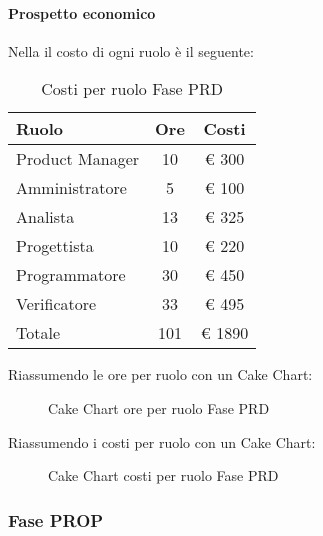 			\paragraph{Prospetto economico}
				Nella  il costo di ogni ruolo è il seguente:
				\begin{table}
					\begin{center}
						\begin{tabular}{| l | c | c |}
							\hline
							Ruolo 				& Ore 		& Costi  \\ \hline
							
							Product Manager		& 10 		& \euro{} 300 	\\
							Amministratore 		& 5 		& \euro{} 100 	\\
							Analista	 		& 13 		& \euro{} 325 	\\
							Progettista 		& 10 		& \euro{} 220  	\\
							Programmatore		& 30 		& \euro{} 450 	\\
							Verificatore		& 33 		& \euro{} 495 	\\ \hline \hline
							
							Totale	 			& 101 		& \euro{} 1890 	\\ \hline
						\end{tabular}
					\end{center}
					\caption{Costi per ruolo Fase PRD}
				\end{table}
				Riassumendo le ore per ruolo con un Cake Chart:
				\begin{figure}\centering
					\caption{Cake Chart ore per ruolo Fase PRD}
				\end{figure}
				Riassumendo i costi per ruolo con un Cake Chart:
				\begin{figure}\centering
					\caption{Cake Chart costi per ruolo Fase PRD}
				\end{figure}
		\subsubsection{Fase PROP}
